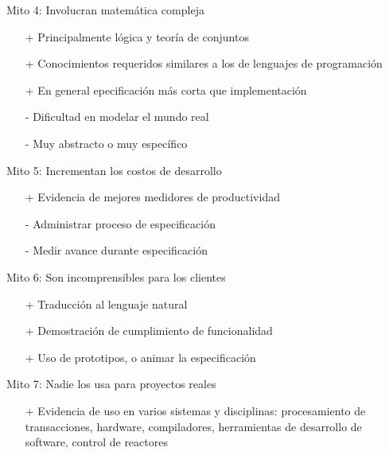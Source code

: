 \documentclass{beamer}
\begin{document}
\begin{frame}{Mito 4: Involucran matem\'atica compleja}
\begin{itemize}[<+->]
\item[+] Principalmente l\'ogica y teor\'ia de conjuntos
\item[+] Conocimientos requeridos similares a los de lenguajes de programaci\'on
\item[+] En general epecificaci\'on m\'as corta que implementaci\'on
\item[-] Dificultad en modelar el mundo real
\item[-] Muy abstracto o muy espec\'ifico
\end{itemize}
\end{frame}
 
\begin{frame}{Mito 5: Incrementan los costos de desarrollo}
\begin{itemize}[<+->]
\item[+] Evidencia de mejores medidores de productividad
\item[-] Administrar proceso de especificaci\'on
\item[-] Medir avance durante especificaci\'on
\end{itemize}
\end{frame}
 
\begin{frame}{Mito 6: Son incomprensibles para los clientes}
\begin{itemize}[<+->]
\item[+] Traducci\'on al lenguaje natural
\item[+] Demostraci\'on de cumplimiento de funcionalidad
\item[+] Uso de prototipos, o animar la especificaci\'on
\end{itemize}
\end{frame}
 
\begin{frame}{Mito 7: Nadie los usa para proyectos reales}
\begin{itemize}[<+->]
\item[+] Evidencia de uso en varios sistemas y disciplinas: procesamiento de transacciones, hardware, compiladores, herramientas de desarrollo de software, control de reactores
\end{itemize}
\end{frame}
\end{document}

